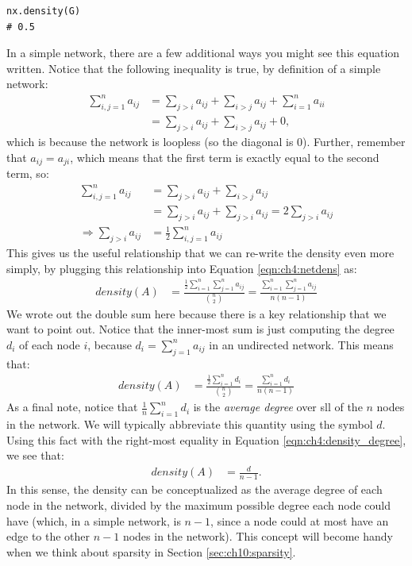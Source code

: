 \begin{lstlisting}[style=python]
nx.density(G)
# 0.5
\end{lstlisting}
In a simple network, there are a few additional ways you might see this equation written. Notice that the following inequality is true, by definition of a simple network:
\begin{align*}
    \sum_{i,j = 1}^n a_{ij} &= \sum_{j > i}a_{ij} + \sum_{i > j}a_{ij} + \sum_{i = 1}^n a_{ii} \\
    &= \sum_{j > i}a_{ij}+ \sum_{i > j}a_{ij} + 0,
\end{align*}
which is because the network is loopless (so the diagonal is $0$). Further, remember that $a_{ij} = a_{ji}$, which means that the first term is {exactly} equal to the second term, so:
\begin{align*}
    \sum_{i,j = 1}^n a_{ij} &= \sum_{j > i}a_{ij}+ \sum_{i > j}a_{ij} \\
    &= \sum_{j > i}a_{ij}+ \sum_{j > i}a_{ij} = 2\sum_{j > i}a_{ij} \\
    \Rightarrow \sum_{j > i}a_{ij} &= \frac{1}{2}\sum_{i,j = 1}^n a_{ij}
\end{align*}
This gives us the useful relationship that we can re-write the density even more simply, by plugging this relationship into Equation \eqref{eqn:ch4:netdens} as:
\begin{align*}
    density(A) &= \frac{\frac{1}{2}\sum_{i = 1}^n \sum_{j = 1}^n a_{ij}}{\binom n 2} = \frac{\sum_{i = 1}^n \sum_{j = 1}^n a_{ij}}{n(n - 1)}
\end{align*}
We wrote out the double sum here because there is a key relationship that we want to point out. Notice that the inner-most sum is just computing the degree $d_i$ of each node $i$, because $d_i = \sum_{j = 1}^n a_{ij}$ in an undirected network. This means that:
\begin{align}
    density(A) &= \frac{\frac{1}{2}\sum_{i = 1}^n d_i}{\binom n 2} = \frac{\sum_{i = 1}^n d_i}{n(n - 1)} \label{eqn:ch4:density_degree}
\end{align}
As a final note, notice that $\frac{1}{n}\sum_{i = 1}^n d_i$ is the \textit{average degree} over sll of the $n$ nodes in the network. We will typically abbreviate this quantity using the symbol $d$. Using this fact with the right-most equality in Equation \eqref{eqn:ch4:density_degree}, we see that:
\begin{align*}
    density(A) &= \frac{d}{n - 1}.
\end{align*}
In this sense, the density can be conceptualized as the average degree of each node in the network, divided by the maximum possible degree each node could have (which, in a simple network, is $n-1$, since a node could at most have an edge to the other $n-1$ nodes in the network). This concept will become handy when we think about sparsity in Section \ref{sec:ch10:sparsity}.


